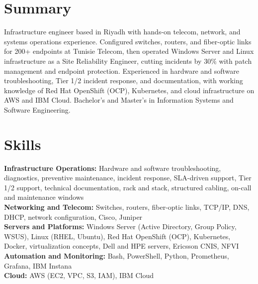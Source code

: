 \documentclass[a4paper,10pt]{article}
\begin{document}

\section*{Summary}
Infrastructure engineer based in Riyadh with hands-on telecom, network, and systems operations experience. Configured switches, routers, and fiber-optic links for 200+ endpoints at Tunisie Telecom, then operated Windows Server and Linux infrastructure as a Site Reliability Engineer, cutting incidents by 30\% with patch management and endpoint protection. Experienced in hardware and software troubleshooting, Tier 1/2 incident response, and documentation, with working knowledge of Red Hat OpenShift (OCP), Kubernetes, and cloud infrastructure on AWS and IBM Cloud. Bachelor's and Master's in Information Systems and Software Engineering.

\section*{Skills}
\textbf{Infrastructure Operations:} Hardware and software troubleshooting, diagnostics, preventive maintenance, incident response, SLA-driven support, Tier 1/2 support, technical documentation, rack and stack, structured cabling, on-call and maintenance windows \\
\textbf{Networking and Telecom:} Switches, routers, fiber-optic links, TCP/IP, DNS, DHCP, network configuration, Cisco, Juniper \\
\textbf{Servers and Platforms:} Windows Server (Active Directory, Group Policy, WSUS), Linux (RHEL, Ubuntu), Red Hat OpenShift (OCP), Kubernetes, Docker, virtualization concepts, Dell and HPE servers, Ericsson CNIS, NFVI \\
\textbf{Automation and Monitoring:} Bash, PowerShell, Python, Prometheus, Grafana, IBM Instana\\
\textbf{Cloud:} AWS (EC2, VPC, S3, IAM), IBM Cloud
\end{document}
